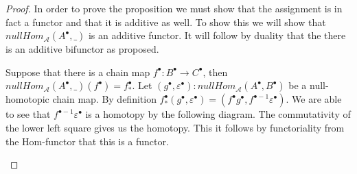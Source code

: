 \documentclass[11pt]{article}
\theoremstyle{definition}
\theoremstyle{remark}
\newcommand{\chain}[1]{#1^{\bullet}}
\begin{document}
            \begin{proof}
                In order to prove the proposition we must show that the assignment is in fact a functor and that it is additive as well. To show this we will show that $nullHom_{\mathcal{A}}(\chain{A},\_)$ is an additive functor. It will follow by duality that the there is an additive bifunctor as proposed.
                
                Suppose that there is a chain map $\chain{f}:\chain{B}\rightarrow\chain{C}$, then $nullHom_{\mathcal{A}}(\chain{A},\_)(\chain{f})=\chain{f}_*$. Let $(\chain{g},\chain{\varepsilon}):nullHom_{\mathcal{A}}(\chain{A},\chain{B})$ be a null-homotopic chain map. By definition $\chain{f}_*(\chain{g},\chain{\varepsilon})=(\chain{f}\chain{g},f^{\bullet-1}\chain{\varepsilon})$. We are able to see that $f^{\bullet-1}\chain{\varepsilon}$ is a homotopy by the following diagram. The commutativity of the lower left square gives us the homotopy. This it follows by functoriality from the Hom-functor that this is a functor.
                \begin{center}
                \end{center}


\end{proof}
\end{document}
